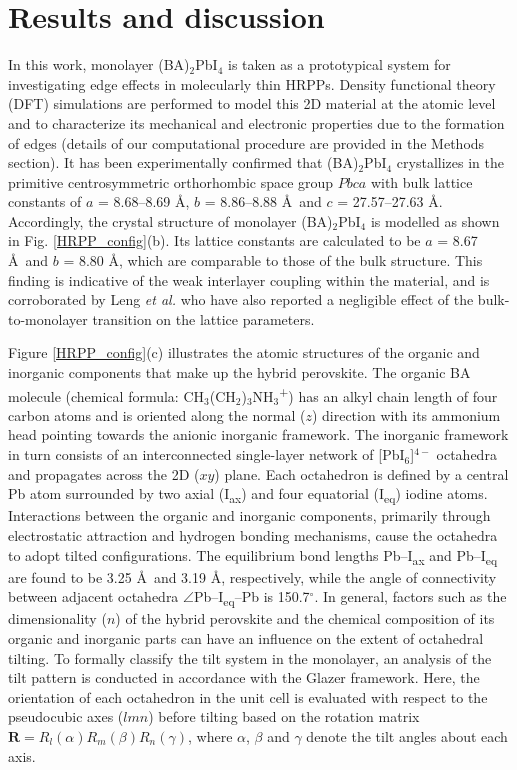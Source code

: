 \documentclass[aps,prl,preprint,11pt,superscriptaddress,bibnotes,amsmath,amssymb,amsfonts,showkeys]{revtex4-2}
\begin{document}
\section{Results and discussion}
In this work, monolayer (BA)$_2$PbI$_4$ is taken as a prototypical system for investigating edge effects in molecularly thin HRPPs. Density functional theory (DFT) simulations are performed to model this 2D material at the atomic level and to characterize its mechanical and electronic properties due to the formation of edges (details of our computational procedure are provided in the Methods section). It has been experimentally confirmed that (BA)$_2$PbI$_4$ crystallizes in the primitive centrosymmetric orthorhombic space group $Pbca$ with bulk lattice constants of $a$ = 8.68--8.69 \AA, $b$ = 8.86--8.88 \AA\ and $c$ = 27.57--27.63 \AA.\cite{LAplanar18,BLcryst07,Mcryst96} Accordingly, the crystal structure of monolayer (BA)$_2$PbI$_4$ is modelled as shown in Fig. \ref{HRPP_config}(b). Its lattice constants are calculated to be $a$ = 8.67 \AA\ and $b$ = 8.80 \AA, which are comparable to those of the bulk structure. This finding is indicative of the weak interlayer coupling within the material, and is corroborated by Leng \textit{et al.} who have also reported a negligible effect of the bulk-to-monolayer transition on the lattice parameters.\cite{LAplanar18}

Figure \ref{HRPP_config}(c) illustrates the atomic structures of the organic and inorganic components that make up the hybrid perovskite. The organic BA molecule (chemical formula: CH$_3$(CH$_2$)$_3$NH$_3$\textsuperscript{+}) has an alkyl chain length of four carbon atoms and is oriented along the normal ($z$) direction with its ammonium head pointing towards the anionic inorganic framework. The inorganic framework in turn consists of an interconnected single-layer network of [PbI$_6$]$^{4-}$ octahedra and propagates across the 2D ($xy$) plane. Each octahedron is defined by a central Pb atom surrounded by two axial (I\textsubscript{ax}) and four equatorial (I\textsubscript{eq}) iodine atoms. Interactions between the organic and inorganic components, primarily through electrostatic attraction and hydrogen bonding mechanisms, cause the octahedra to adopt tilted configurations. The equilibrium bond lengths Pb--I\textsubscript{ax} and Pb--I\textsubscript{eq} are found to be 3.25 \AA\ and 3.19 \AA, respectively, while the angle of connectivity between adjacent octahedra $\angle$Pb--I\textsubscript{eq}--Pb is 150.7$^\circ$. In general, factors such as the dimensionality ($n$) of the hybrid perovskite and the chemical composition of its organic and inorganic parts can have an influence on the extent of octahedral tilting.\cite{SCqwell16,SHstab19,Mcryst96,SNtilt19} To formally classify the tilt system in the monolayer, an analysis of the tilt pattern is conducted in accordance with the Glazer framework.\cite{Gtilt72} Here, the orientation of each octahedron in the unit cell is evaluated with respect to the pseudocubic axes ($lmn$) before tilting based on the rotation matrix $\textbf{R} = R_{l}(\alpha) R_{m}(\beta) R_{n}(\gamma)$, where $\alpha$, $\beta$ and $\gamma$ denote the tilt angles about each axis.
\end{document}
